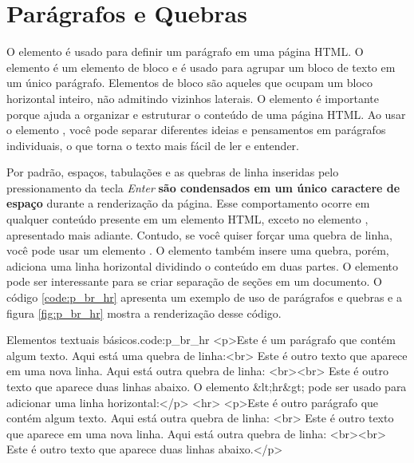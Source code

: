 \section{Parágrafos e Quebras}

O elemento  é usado para definir um parágrafo em uma página HTML. O elemento  é um elemento de bloco e é usado para agrupar um bloco de texto em um único parágrafo. Elementos de bloco são aqueles que ocupam um bloco horizontal inteiro, não admitindo vizinhos laterais. O elemento  é importante porque ajuda a organizar e estruturar o conteúdo de uma página HTML. Ao usar o elemento , você pode separar diferentes ideias e pensamentos em parágrafos individuais, o que torna o texto mais fácil de ler e entender. 

Por padrão, espaços, tabulações e as quebras de linha inseridas pelo pressionamento da tecla \textit{Enter} \textbf{são condensados em um único caractere de espaço} durante a renderização da página. Esse comportamento ocorre em qualquer conteúdo presente em um elemento HTML, exceto no elemento , apresentado mais adiante. Contudo, se você quiser forçar uma quebra de linha, você pode usar um elemento . O elemento  também insere uma quebra, porém, adiciona uma linha horizontal dividindo o conteúdo em duas partes. O elemento  pode ser interessante para se criar separação de seções em um documento. O código \ref{code:p_br_hr} apresenta um exemplo de uso de parágrafos e quebras e a figura \ref{fig:p_br_hr} mostra a renderização desse código.

\begin{htmlcode}{Elementos textuais básicos.}{code:p_br_hr}
<p>Este é um parágrafo que contém algum texto. Aqui está uma quebra de linha:<br>
Este é outro texto que aparece em uma nova linha. Aqui está outra quebra de linha:
<br><br> Este é outro texto que aparece duas linhas abaixo. O elemento &lt;hr&gt;
pode ser usado para adicionar uma linha horizontal:</p>
<hr>
<p>Este é outro parágrafo que contém algum texto. Aqui está outra quebra de linha:
<br> Este é outro texto que aparece em uma nova linha. Aqui está outra quebra de
linha: <br><br> Este é outro texto que aparece duas linhas abaixo.</p>
\end{htmlcode}

